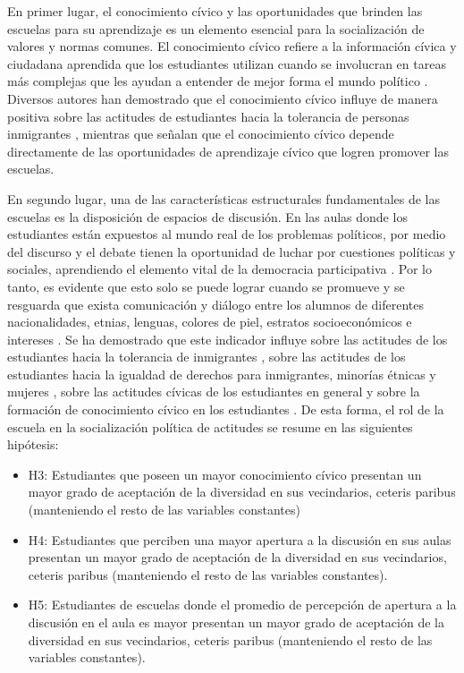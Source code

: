 \documentclass[12pt,twoside]{templates/facsothesis}
\begin{document}
En primer lugar, el conocimiento cívico y las oportunidades que brinden las escuelas para su aprendizaje es un elemento esencial para la socialización de valores y normas comunes. El conocimiento cívico refiere a la información cívica y ciudadana aprendida que los estudiantes utilizan cuando se involucran en tareas más complejas que les ayudan a entender de mejor forma el mundo político \citep{carstens_Overview_2018}. Diversos autores han demostrado que el conocimiento cívico influye de manera positiva sobre las actitudes de estudiantes hacia la tolerancia de personas inmigrantes \citep{isac_Native_2012, groof_Influence_2008, torney-purta_How_2008}, mientras que \citet{sampermans_Back_2020} señalan que el conocimiento cívico depende directamente de las oportunidades de aprendizaje cívico que logren promover las escuelas.

En segundo lugar, una de las características estructurales fundamentales de las escuelas es la disposición de espacios de discusión. En las aulas donde los estudiantes están expuestos al mundo real de los problemas políticos, por medio del discurso y el debate tienen la oportunidad de luchar por cuestiones políticas y sociales, aprendiendo el elemento vital de la democracia participativa \citep{campbell_Voice_2008}. Por lo tanto, es evidente que esto solo se puede lograr cuando se promueve y se resguarda que exista comunicación y diálogo entre los alumnos de diferentes nacionalidades, etnias, lenguas, colores de piel, estratos socioeconómicos e intereses \citep{riedemann_Desde_2020}. Se ha demostrado que este indicador influye sobre las actitudes de los estudiantes hacia la tolerancia de inmigrantes \citep{maurissen_Classroom_2020, groof_Influence_2008, isac_Native_2012}, sobre las actitudes de los estudiantes hacia la igualdad de derechos para inmigrantes, minorías étnicas y mujeres \citep{trevino_Influence_2018, trevino_Influence_2017}, sobre las actitudes cívicas de los estudiantes en general \citep{barber_Profiles_2020} y sobre la formación de conocimiento cívico en los estudiantes \citep{sampermans_Back_2020, barber_Immigrant_2015}. De esta forma, el rol de la escuela en la socialización política de actitudes se resume en las siguientes hipótesis:

\begin{itemize}
\item
  H3: Estudiantes que poseen un mayor conocimiento cívico presentan un mayor grado de aceptación de la diversidad en sus vecindarios, ceteris paribus (manteniendo el resto de las variables constantes)
\item
  H4: Estudiantes que perciben una mayor apertura a la discusión en sus aulas presentan un mayor grado de aceptación de la diversidad en sus vecindarios, ceteris paribus (manteniendo el resto de las variables constantes).
\item
  H5: Estudiantes de escuelas donde el promedio de percepción de apertura a la discusión en el aula es mayor presentan un mayor grado de aceptación de la diversidad en sus vecindarios, ceteris paribus (manteniendo el resto de las variables constantes).
\end{itemize}
\end{document}
